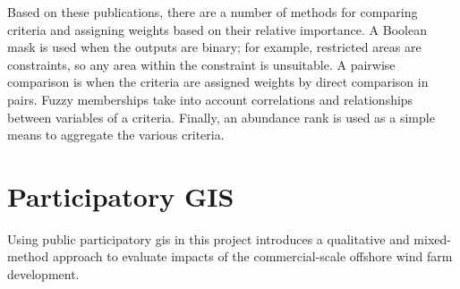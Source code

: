 Based on these publications, there are a number of methods for comparing
criteria and assigning weights based on their relative importance. A Boolean
mask is used when the outputs are binary; for example, restricted areas are
constraints, so any area within the constraint is unsuitable. A pairwise
comparison is when the criteria are assigned weights by direct comparison in
pairs. Fuzzy memberships take into account correlations and relationships
between variables of a criteria. Finally, an abundance rank is used as a simple
means to aggregate the various criteria.

\section{Participatory GIS}

Using public participatory \gls{gis} in this project introduces a qualitative
and mixed-method approach to evaluate impacts of the commercial-scale offshore
wind farm development.
